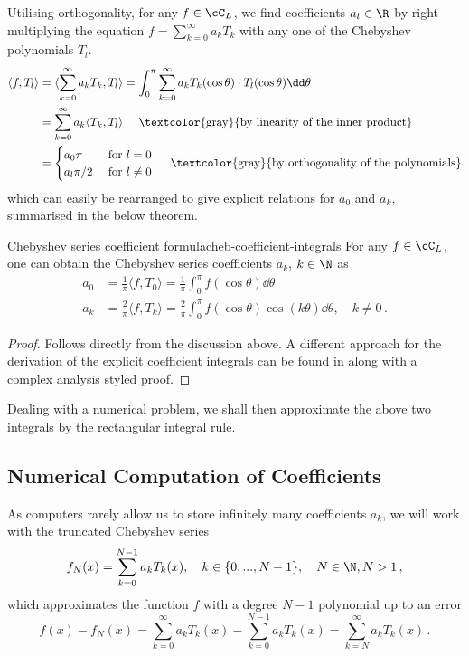 \documentclass[12pt, a4paper]{article}
\newcommand{\chebyshev}{Chebyshev\xspace}
\begin{document}
  Utilising orthogonality, for any $f \in \cC_L$, we find coefficients $a_l \in \R$ by right-multiplying the equation $f = \sum_{k=0}^\infty a_k T_k$ with any one of the \chebyshev polynomials $T_l$.
  \begin{align*}
    \langle f, T_l \rangle & = \langle \sum_{k=0}^\infty a_k T_k, T_l \rangle = \int_0^\pi \sum_{k=0}^\infty a_k T_k(\cos \theta) \cdot T_l(\cos \theta) \dd\theta \\
                           & = \sum_{k=0}^\infty a_k \langle T_k, T_l \rangle \quad \text{ \textcolor{gray}{by linearity of the inner product}}                    \\
                           & = \begin{cases}
                                 a_0 \pi   & \text{ for } l = 0    \\
                                 a_l \pi/2 & \text{ for } l \neq 0
                               \end{cases} \quad \text{ \textcolor{gray}{by orthogonality of the polynomials}}
  \end{align*}
  which can easily be rearranged to give explicit relations for $a_0$ and $a_k$, summarised in the below theorem.
  \begin{theorem}{Chebyshev series coefficient formula}{cheb-coefficient-integrals}
    For any $f \in \cC_L$, one can obtain the \chebyshev series coefficients $a_k$, $k \in \N$ as
    \begin{align*}
      a_0 & = \frac{1}{\pi} \langle f, T_0 \rangle =  \frac{1}{\pi} \int_0^\pi f(\cos \theta) \dd\theta                                   \\
      a_k & = \frac{2}{\pi} \langle f, T_k \rangle = \frac{2}{\pi} \int_0^\pi f(\cos \theta) \cos(k \theta) \dd\theta, \quad k \neq 0 \,.
    \end{align*}
  \end{theorem}
  \begin{proof}
    Follows directly from the discussion above.
    A different approach for the derivation of the explicit coefficient integrals can be found in \cite{atap} along with a complex analysis styled proof.
  \end{proof}

  Dealing with a numerical problem, we shall then approximate the above two integrals by the rectangular integral rule.

  \subsection{Numerical Computation of Coefficients}
  \label{subsection:numerical-coeffs}
  As computers rarely allow us to store infinitely many coefficients $a_k$, we will work with the truncated \chebyshev series
  \begin{equation}
    f_N(x) = \sum_{k=0}^{N-1} a_k T_k(x), \quad k \in \{0, ..., N-1\},\quad N \in \N, N > 1\,,
    \label{eq:truncated-cheb-series}
  \end{equation}
  which approximates the function $f$ with a degree $N-1$ polynomial up to an error
  $$f(x) - f_N(x) = \sum_{k=0}^{\infty} a_k T_k(x) - \sum_{k=0}^{N-1} a_k T_k(x) = \sum_{k=N}^{\infty} a_k T_k(x) \,.$$
\end{document}
